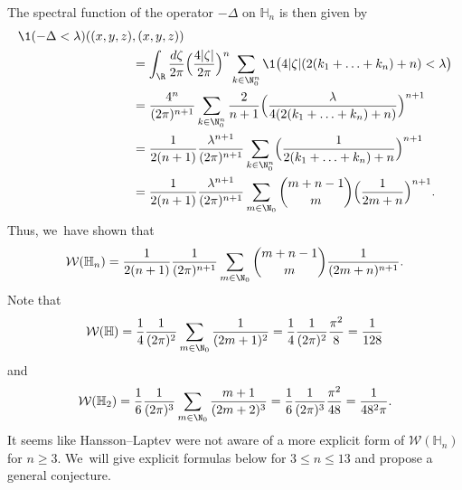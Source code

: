 The spectral function of the operator $-\Delta$ on $\mathbb H_n$ is then given by
\begin{align*}
\1(-\Delta<\lambda)((x,y,z)&,(x,y,z)) \\
& = \int_\R \frac{d\zeta}{2\pi} \Bigl(\frac{4|\zeta|}{2\pi}\Bigr)^n \sum_{k \in\N_0^n} \1\bigl(4|\zeta|(2(k_1+\ldots+k_n)+n)<\lambda\bigr) \\
& = \frac{4^n}{(2\pi)^{n+1}} \sum_{k\in\N_0^n} \frac{2}{n+1} \Bigl(\frac{\lambda}{4(2(k_1+\ldots+k_n)+n)}\Bigr)^{n+1} \\
& = \frac{1}{2(n+1)} \frac{\lambda^{n+1}}{(2\pi)^{n+1}} \sum_{k\in\N_0^n} \Bigl(\frac{1}{2(k_1+\ldots+k_n)+n}\Bigr)^{n+1} \\
& = \frac{1}{2(n+1)} \frac{\lambda^{n+1}}{(2\pi)^{n+1}} \sum_{m\in\N_0} \binom{m+n-1}{m} \Bigl(\frac{1}{2m+n}\Bigr)^{n+1}.
\end{align*}
Thus, we~have shown that
\begin{equation}\label{w4}
\mathcal W(\mathbb H_n) = \frac{1}{2(n+1)} \frac{1}{(2\pi)^{n+1}} \sum_{m\in\N_0} \binom{m+n-1}{m} \frac{1}{(2m+n)^{n+1}}.
\end{equation}
Note that
\begin{equation}\label{eq:W1}
\mathcal W(\mathbb H) = \frac{1}{4} \frac{1}{(2\pi)^2} \sum_{m\in\N_0} \frac{1}{(2m+1)^2} = \frac14 \frac1{(2\pi)^2} \frac{\pi^2}8 = \frac1{128}
\end{equation}
and
\begin{equation}\label{eq:W2}
\mathcal W(\mathbb H_2) = \frac{1}{6} \frac{1}{(2\pi)^3} \sum_{m\in\N_0} \frac{m+1}{(2m+2)^3} = \frac{1}{6} \frac{1}{(2\pi)^3} \frac{\pi^2}{48} = \frac{1}{48^2 \pi}.
\end{equation}
It seems like Hansson--Laptev \cite{HL} were not aware of a more explicit form of $\mathcal W(\mathbb H_n)$ for $n\geq 3$. We~will give explicit formulas below for $3\leq n \leq 13$ and propose a general conjecture.

